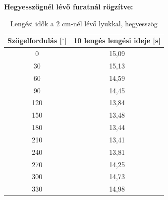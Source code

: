 \documentclass{article}
\begin{document}
\vspace{0.5em}
\noindent
\textbf{Hegyesszögnél lévő furatnál rögzítve:}
\begin{table}[H]
    \centering
    \begin{tabular}{|c|c|}
        \hline
        Szögelfordulás [$^\circ$] & 10 lengés lengési ideje [s] \\ \hline
        0                         & 15,09                       \\ \hline 
        30                        & 15,13                       \\ \hline
        60                        & 14,59                       \\ \hline 
        90                        & 14,45                       \\ \hline
        120                       & 13,84                       \\ \hline 
        150                       & 13,48                       \\ \hline
        180                       & 13,44                       \\ \hline
        210                       & 13,41                       \\ \hline
        240                       & 13,81                       \\ \hline
        270                       & 14,25                       \\ \hline
        300                       & 14,73                       \\ \hline
        330                       & 14,98                       \\ \hline
    \end{tabular}
    \caption{Lengési idők a 2 cm-nél lévő lyukkal, hegyesszög}
    \label{tab:lengesiido_2.1}
\end{table}
\end{document}
